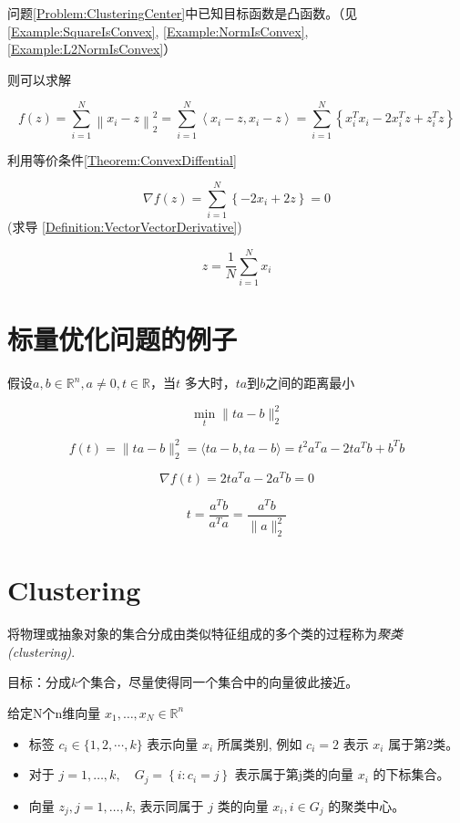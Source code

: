 问题\ref{Problem:ClusteringCenter}中已知目标函数是凸函数。（见\ref{Example:SquareIsConvex}, \ref{Example:NormIsConvex}, \ref{Example:L2NormIsConvex}）

则可以求解

$$ f(z)=\sum_{i=1}^{N}\left\|x_{i}-z\right\|_{2}^{2}=\sum_{i=1}^{N}\left\langle x_{i}-z, x_{i}-z\right\rangle=\sum_{i=1}^{N}\left\{x_{i}^{T} x_{i}-2 x_{i}^{T} z+z_{i}^{T} z\right\} $$

利用等价条件\ref{Theorem:ConvexDiffential}

$$ \nabla f(z)=\sum_{i=1}^{N}\left\{-2 x_{i}+2 z\right\}=0 $$ (求导 \ref{Definition:VectorVectorDerivative})

$$ z=\frac{1}{N} \sum_{i=1}^{N} x_{i} $$

\section{标量优化问题的例子}

\begin{problem}
    假设$ a, b \in \mathbb{R}^{n}, a \neq 0, t \in \mathbb{R} $，当$t$ 多大时，$ta$到$b$之间的距离最小

    $$ \min _{t}\|t a-b\|_{2}^{2} $$

    $$ f(t)=\|t a-b\|_{2}^{2}=\langle t a-b, t a-b\rangle=t^{2} a^{T} a-2 t a^{T} b+b^{T} b $$

    $$ \nabla f(t)=2 t a^{T} a-2 a^{T} b=0 $$

    $$ t=\frac{a^{T} b}{a^{T} a}=\frac{a^{T} b}{\|a\|_{2}^{2}} $$
\end{problem}

\section{Clustering}

将物理或抽象对象的集合分成由类似特征组成的多个类的过程称为\textit{聚类(clustering)}.



目标：分成$k$个集合，尽量使得同一个集合中的向量彼此接近。

\begin{notation}
    给定N个n维向量 $ x_{1}, \ldots, x_{N} \in \mathbb{R}^{n} $

    \begin{itemize}
        \item 标签 $ c_{i} \in\{1,2, \cdots, k\} $ 表示向量 $ x_{i} $ 所属类别, 例如 $ c_{i}=2 $ 表示 $ x_{i} $ 属于第2类。
        \item 对于 $ j=1, \ldots, k, \quad G_{j}=\left\{i: c_{i}=j\right\} $ 表示属于第j类的向量 $ x_{i} $ 的下标集合。
        \item 向量 $ z_{j}, j=1, \ldots, k $, 表示同属于 $ j $ 类的向量 $ x_{i}, i \in G_{j} $ 的聚类中心。
    \end{itemize}
\end{notation}

